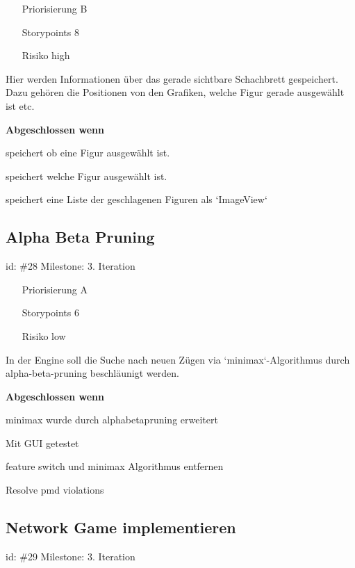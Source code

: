 \begin{itemize}
\item[Priorisierung] B
\item[Storypoints] 8
\item[Risiko] high
\end{itemize}

Hier werden Informationen über das gerade sichtbare Schachbrett gespeichert. Dazu gehören die Positionen von den Grafiken, welche Figur gerade ausgewählt ist etc.

\textbf{Abgeschlossen wenn}
\begin{todolist}
    \item[\done]  speichert ob eine Figur ausgewählt ist.
  \item[\done]  speichert welche Figur ausgewählt ist.
  \item[\done]  speichert eine Liste der geschlagenen Figuren als `ImageView`

\end{todolist}


\subsection*{Alpha Beta Pruning}
id: \#28 Milestone: 3. Iteration\\

\begin{itemize}
\item[Priorisierung] A
\item[Storypoints] 6
\item[Risiko] low
\end{itemize}

In der Engine soll die Suche nach neuen Zügen via `minimax`-Algorithmus durch alpha-beta-pruning beschläunigt werden.

\textbf{Abgeschlossen wenn}
\begin{todolist}
    \item[\done]  minimax wurde durch alphabetapruning erweitert
  \item[\done]  Mit GUI getestet
  \item[\done]  feature switch und minimax Algorithmus entfernen
  \item[\done]  Resolve pmd violations

\end{todolist}


\subsection*{Network Game implementieren}
id: \#29 Milestone: 3. Iteration\\

